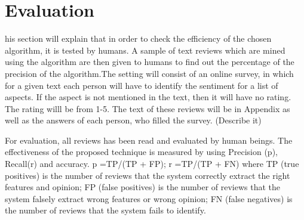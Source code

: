%
%
\let\textcircled=\pgftextcircled
\chapter{Evaluation}
\label{chap:dis}
his section will explain that in order to check the efficiency of the chosen algorithm, it is tested by humans. A sample of text reviews which are mined using the algorithm are then given to humans to find out the percentage of the precision of the algorithm.The setting will consist of an online survey, in which for a given text each person will have to identify the sentiment for a list of aspects. If the aspect is not mentioned in the text, then it will have no rating. The rating willl be from 1-5. The text of these reviews will be in Appendix as well as the answers of each person, who filled the survey. (Describe it)

For evaluation, all reviews has been read and evaluated by human beings. The effectiveness of the proposed technique is measured by using Precision (p), Recall(r) and accuracy. 
p =TP/(TP + FP); r =TP/(TP + FN)
where TP (true positives) is the number of reviews that the system correctly extract the right features and opinion; FP (false positives) is the number of reviews that the system falsely extract wrong features or wrong opinion; FN (false negatives) is the number of reviews that the system fails to identify. \cite{yaakub2012integration}